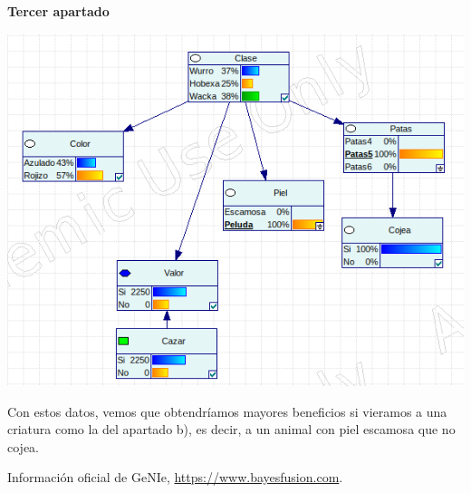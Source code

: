 \documentclass{article}
\begin{document}
\textbf{Tercer apartado}

\begin{center}
\includegraphics[scale=0.5]{c.png}
\end{center}

Con estos datos, vemos que obtendríamos mayores beneficios si vieramos a una criatura como la del apartado b), es decir, a un animal con piel escamosa que no cojea.

\begin{thebibliography}{9}
 Información oficial de GeNIe, \url{https://www.bayesfusion.com}.
\end{thebibliography}
\end{document}
